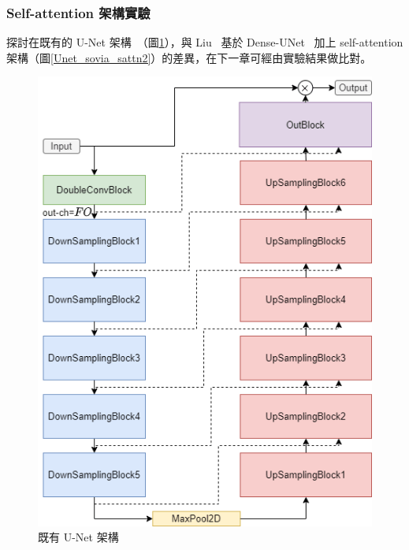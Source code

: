 
\subsubsection{Self-attention 架構實驗}
探討在既有的 U-Net 架構~\cite{ronneberger2015u}（圖\ref{Unet_sovia_sattn1}），與 Liu~\cite{liu2020voice} 基於 Dense-UNet~\cite{stoller2018adversarial} 加上 self-attention 架構（圖\ref{Unet_sovia_sattn2}）的差異，在下一章可經由實驗結果做比對。
\begin{figure}[htbp]
    \hfil
    \begin{minipage}[t]{0.45\textwidth}
        \includegraphics[width=\textwidth]{./figures/chapter04_experiment/Unet_sovia_sattn1.png}
        \caption {既有 U-Net 架構}
        \label{Unet_sovia_sattn1}
    \end{minipage}
    \hfil
\end{figure}
